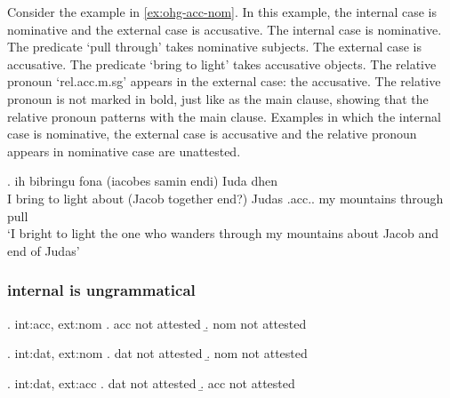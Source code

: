 

Consider the example in \ref{ex:ohg-acc-nom}. In this example, the internal case is nominative and the external case is accusative.
The internal case is nominative. The predicate  `pull through' takes nominative subjects.
The external case is accusative. The predicate  `bring to light' takes accusative objects.
The relative pronoun  `\ac{rel}.\ac{acc}.\ac{m}.\ac{sg}' appears in the external case: the accusative. The relative pronoun is not marked in bold, just like as the main clause, showing that the relative pronoun patterns with the main clause.
Examples in which the internal case is nominative, the external case is accusative and the relative pronoun appears in nominative case are unattested.

\exg. ih bibringu fona (iacobes samin endi) Iuda dhen   \\
 I {bring to light}\scsub{[acc]} about (Jacob together end?) Judas .\ac{acc}.. my mountains {through pull}\scsub{[nom]}\\
 `I bright to light the one who wanders through my mountains about Jacob and end of Judas' \label{ex:ohg-acc-nom}
















  \subsubsection{internal is ungrammatical}

  \ex. \ac{int}:\ac{acc}, \ac{ext}:\ac{nom}
  \a. \ac{acc} not attested
  \b. \ac{nom} not attested

 \ex. \ac{int}:\ac{dat}, \ac{ext}:\ac{nom}
 \a. \ac{dat} not attested
 \b. \ac{nom} not attested

 \ex. \ac{int}:\ac{dat}, \ac{ext}:\ac{acc}
 \a. \ac{dat} not attested
 \b. \ac{acc} not attested




